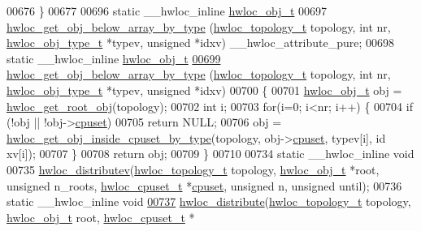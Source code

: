 \begin{DoxyCode}
00676 \}
00677 
00696 \textcolor{keyword}{static} \_\_hwloc\_inline \hyperlink{a00016}{hwloc_obj_t}
00697 \hyperlink{a00058_gac33a0990f4e771b2117ddedabc3f00f6}{hwloc_get_obj_below_array_by_type} (\hyperlink{a00039_ga9d1e76ee15a7dee158b786c30b6a6e38}{hwloc_topology_t} topology, \textcolor{keywordtype}{int} nr, 
      \hyperlink{a00041_gacd37bb612667dc437d66bfb175a8dc55}{hwloc_obj_type_t} *typev, \textcolor{keywordtype}{unsigned} *idxv) \_\_hwloc\_attribute\_pure;
00698 \textcolor{keyword}{static} \_\_hwloc\_inline \hyperlink{a00016}{hwloc_obj_t}
\hypertarget{a00031_source_l00699}{}\hyperlink{a00058_gac33a0990f4e771b2117ddedabc3f00f6}{00699} \hyperlink{a00058_gac33a0990f4e771b2117ddedabc3f00f6}{hwloc_get_obj_below_array_by_type} (\hyperlink{a00039_ga9d1e76ee15a7dee158b786c30b6a6e38}{hwloc_topology_t} topology, \textcolor{keywordtype}{int} nr, 
      \hyperlink{a00041_gacd37bb612667dc437d66bfb175a8dc55}{hwloc_obj_type_t} *typev, \textcolor{keywordtype}{unsigned} *idxv)
00700 \{
00701   \hyperlink{a00016}{hwloc_obj_t} obj = \hyperlink{a00053_gadbf58f6e187efbdb3cd9a8e30311b7d7}{hwloc_get_root_obj}(topology);
00702   \textcolor{keywordtype}{int} i;
00703   \textcolor{keywordflow}{for}(i=0; i<nr; i++) \{
00704     \textcolor{keywordflow}{if} (!obj || !obj->\hyperlink{a00016_a67925e0f2c47f50408fbdb9bddd0790f}{cpuset})
00705       \textcolor{keywordflow}{return} NULL;
00706     obj = \hyperlink{a00054_gaa8dcdb85224f7350b90fb0a1ca91e6d6}{hwloc_get_obj_inside_cpuset_by_type}(topology, obj->\hyperlink{a00016_a67925e0f2c47f50408fbdb9bddd0790f}{cpuset}, typev[i], id
      xv[i]);
00707   \}
00708   \textcolor{keywordflow}{return} obj;
00709 \}
00710 
00734 \textcolor{keyword}{static} \_\_hwloc\_inline \textcolor{keywordtype}{void}
00735 \hyperlink{a00059_gaf057d7c5e3cb3df897ce527258537619}{hwloc_distributev}(\hyperlink{a00039_ga9d1e76ee15a7dee158b786c30b6a6e38}{hwloc_topology_t} topology, \hyperlink{a00016}{hwloc_obj_t} *root, \textcolor{keywordtype}{unsigned} n\_roots,
       \hyperlink{a00040_ga4bbf39b68b6f568fb92739e7c0ea7801}{hwloc_cpuset_t} *\hyperlink{a00016_a67925e0f2c47f50408fbdb9bddd0790f}{cpuset}, \textcolor{keywordtype}{unsigned} n, \textcolor{keywordtype}{unsigned} until);
00736 \textcolor{keyword}{static} \_\_hwloc\_inline \textcolor{keywordtype}{void}
\hypertarget{a00031_source_l00737}{}\hyperlink{a00059_ga6d5c88292ad5aa062c1bebc99369c042}{00737} \hyperlink{a00059_ga6d5c88292ad5aa062c1bebc99369c042}{hwloc_distribute}(\hyperlink{a00039_ga9d1e76ee15a7dee158b786c30b6a6e38}{hwloc_topology_t} topology, \hyperlink{a00016}{hwloc_obj_t} root, \hyperlink{a00040_ga4bbf39b68b6f568fb92739e7c0ea7801}{hwloc_cpuset_t} *

\end{DoxyCode}
